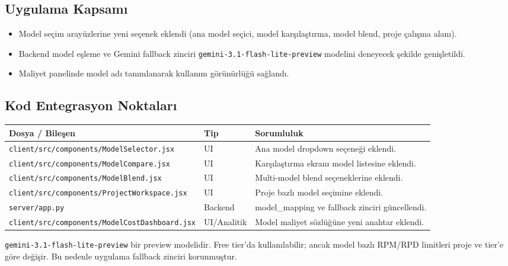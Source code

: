 \documentclass[11pt,a4paper]{article}
\begin{document}
\subsection{Uygulama Kapsamı}
\begin{itemize}[leftmargin=1.5em]
  \item Model seçim arayüzlerine yeni seçenek eklendi (ana model seçici, model karşılaştırma, model blend, proje çalışma alanı).
  \item Backend model eşleme ve Gemini fallback zinciri \texttt{gemini-3.1-flash-lite-preview} modelini deneyecek şekilde genişletildi.
  \item Maliyet panelinde model adı tanımlanarak kullanım görünürlüğü sağlandı.
\end{itemize}

\subsection{Kod Entegrasyon Noktaları}

\begin{tabularx}{\textwidth}{@{} L{6cm} L{1.5cm} X @{}}
\toprule
\textbf{Dosya / Bileşen} & \textbf{Tip} & \textbf{Sorumluluk} \\
\midrule
\texttt{client/src/components/ModelSelector.jsx} & UI & Ana model dropdown seçeneği eklendi. \\
\addlinespace
\texttt{client/src/components/ModelCompare.jsx} & UI & Karşılaştırma ekranı model listesine eklendi. \\
\addlinespace
\texttt{client/src/components/ModelBlend.jsx} & UI & Multi-model blend seçeneklerine eklendi. \\
\addlinespace
\texttt{client/src/components/ProjectWorkspace.jsx} & UI & Proje bazlı model seçimine eklendi. \\
\addlinespace
\texttt{server/app.py} & Backend & model\_mapping ve fallback zinciri güncellendi. \\
\addlinespace
\texttt{client/src/components/ModelCostDashboard.jsx} & UI/Analitik & Model maliyet sözlüğüne yeni anahtar eklendi. \\
\bottomrule
\end{tabularx}

\begin{warnbox}
\texttt{gemini-3.1-flash-lite-preview} bir preview modelidir. Free tier'da kullanılabilir; ancak model bazlı RPM/RPD limitleri proje ve tier'e göre değişir. Bu nedenle uygulama fallback zinciri korunmuştur.
\end{warnbox}
\end{document}
